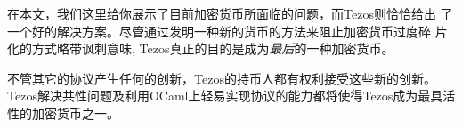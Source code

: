\documentclass[letterpaper]{article}
\begin{document}
在本文，我们这里给你展示了目前加密货币所面临的问题，而Tezos则恰恰给出
了一个好的解决方案。尽管通过发明一种新的货币的方法来阻止加密货币过度碎
片化的方式略带讽刺意味, Tezos真正的目的是成为\emph{最后}的一种加密货币。

不管其它的协议产生任何的创新，Tezos的持币人都有权利接受这些新的创新。Tezos解决共性问题及利用OCaml上轻易实现协议的能力都将使得Tezos成为最具活性的加密货币之一。



\end{document}
